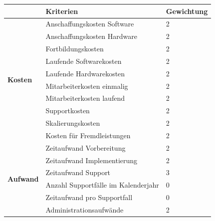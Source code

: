 \begin{table}
	\centering
	\begin{tabular}{l|l|l|}
		                                       & \textbf{Kriterien}                  & \textbf{Gewichtung} \\
		\hline \hline
		\multirow{10}{6em}{\textbf{Kosten}}    & Anschaffungskosten Software         & 2                   \\
		~                                      & Anschaffungskosten Hardware         & 2                   \\
		~                                      & Fortbildungskosten                  & 2                   \\
		~                                      & Laufende Softwarekosten             & 2                   \\
		~                                      & Laufende Hardwarekosten             & 2                   \\
		~                                      & Mitarbeiterkosten einmalig          & 2                   \\
		~                                      & Mitarbeiterkosten laufend           & 2                   \\
		~                                      & Supportkosten                       & 2                   \\
		~                                      & Skalierungskosten                   & 2                   \\
		~                                      & Kosten für Fremdleistungen          & 2                   \\
		\cline{2-3}
		\multirow{6}{6em}{\textbf{Aufwand}}    & Zeitaufwand Vorbereitung            & 2                   \\
		~                                      & Zeitaufwand Implementierung         & 2                   \\
		~                                      & Zeitaufwand Support                 & 3                   \\
		~                                      & Anzahl Supportfälle im Kalenderjahr & 0                   \\
		~                                      & Zeitaufwand pro Supportfall         & 0                   \\
		~                                      & Administrationsaufwände             & 2                   \\

\end{tabular}
\end{table}
